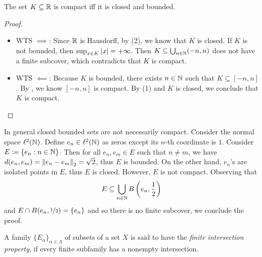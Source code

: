 \documentclass{techreport}
\begin{document}
\begin{theorem}\label{The:HeineBorelProperty}
	The set $K \subseteq \mathbb{R}$ is compact iff it is closed and bounded.
\end{theorem}
\begin{proof}
	\begin{itemize}
		\item WTS ${\implies}$: Since $\mathbb{R}$ is Hausdorff, by (2), we know that $K$ is closed.
		If $K$ is not bounded, then $\sup_{x \in K} \left|{x}\right| = +\infty$.
		Then $K \subseteq \bigcup_{n \in \mathbb{N}} (-n,n)$ does not have a finite subcover, which contradicts that $K$ is compact.
		
		\item WTS ${\impliedby}$: Because $K$ is bounded, there exists $n \in \mathbb{N}$ such that $K \subseteq [-n,n]$.
		By , we know $[-n,n]$ is compact.
		By (1) and $K$ is closed, we conclude that $K$ is compact.
	\end{itemize}
\end{proof}

\begin{example}\label{Exa:ClosedBoundedNotCompact}
	In general closed bounded sets are not necessarily compact.
	Consider the normal space $\ell^2(\mathbb{N})$.
	Define $e_n \in \ell^2(\mathbb{N})$ as zeros except its $n$-th coordinate is $1$.
	Consider $E \coloneqq \left\{ {e_n : n \in \mathbb{N}} \right\}$.
	Then for all $e_n,e_m \in E$ such that $n\ne m$, we have $d(e_n,e_m) = \left\|{e_n - e_m}\right\|_2 = \sqrt{2}$, thus $E$ is bounded.
	On the other hand, $e_n$'s are isolated points in $E$, thus $E$ is closed.
	However, $E$ is not compact.
	Observing that
	\[
	E \subseteq \bigcup_{n \in \mathbb{N}} B\left({e_n, \frac{1}{2}}\right)
	\]
	and $E \cap B(e_n,\nicefrac{1}{2}) = \{ e_n \}$ and so there is no finite subcover,
	we conclude the proof.
\end{example}

\begin{definition}\label{De:FiniteIntersectionProperty}
	A family $\{E_\alpha\}_{\alpha \in \Lambda}$ of subsets of a set $X$ is said to have the \emph{finite intersection property}, if every finite subfamily has a nonempty intersection.
\end{definition}
\end{document}
